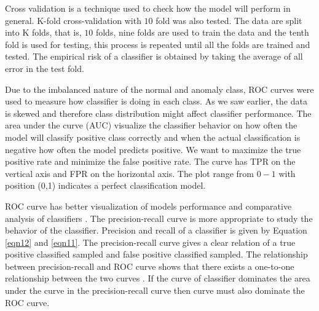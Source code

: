 \documentclass[final,5p,times,twocolumn,authoryear]{elsarticle}
\begin{document}
Cross validation is a technique used to check how the model will perform in general. K-fold cross-validation with $10$ fold was also tested. The data are split into K folds, that is, $10$ folds, nine folds are used to train the data and the tenth fold is used for testing, this process is repeated until all the folds are trained and tested. The empirical risk of a classifier is obtained by taking the average of all error in the test fold. 

Due to the imbalanced nature of the normal and anomaly class, ROC curves were used to measure how classifier is doing in each class. As we saw earlier, the data is skewed and therefore class distribution might affect classifier performance. The area under the curve (AUC) visualize the classifier behavior on how often the model will classify positive class correctly and when the actual classification is negative how often the model predicts positive. We want to maximize the true positive rate and minimize the false positive rate. The curve has TPR on the vertical axis and FPR on the horizontal axis. The plot range from  $0 -1$ with position (0,1) indicates a perfect classification model. 

ROC curve has better visualization of models performance and comparative analysis of classifiers \cite{japkowicz2011evaluating}.  The precision-recall curve is more appropriate to study the behavior of the classifier. Precision and recall of a classifier is given by  Equation  \eqref{eqn12} and \eqref{eqn11}. The precision-recall curve gives a clear relation of a true positive classified sampled and false positive classified sampled. The relationship between precision-recall and ROC curve shows that there exists a one-to-one relationship between the two curves \cite{davis2006relationship}. If the curve of classifier dominates the area under the curve in the precision-recall curve then curve must also dominate the ROC curve.
\end{document}
